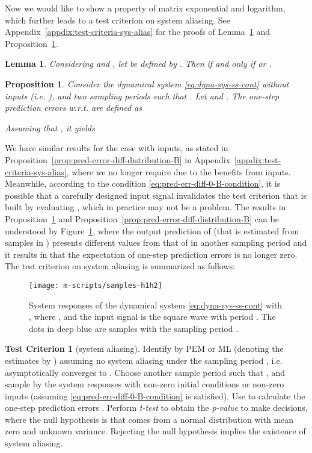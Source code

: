 \documentclass[letterpaper,10pt,journal,final]{IEEEtran}
\newtheorem{lemma}[theorem]{Lemma}
\newtheorem{proposition}[theorem]{Proposition}
\theoremstyle{definition}
\newtheorem*{criteria}{Test Criterion}
\theoremstyle{remark}
\begin{document}
Now we would like to show a property of matrix exponential and logarithm, which
further leads to a test criterion on system aliasing.  See
Appendix~\ref{appdix:test-criteria-sys-alias} for the proofs of
Lemma~\ref{lemma:diff-A-h1h2} and
Proposition~\ref{prop:pred-error-diff-distribution}.
\begin{lemma}
  \label{lemma:diff-A-h1h2}
  Considering  and , let
   be defined by . Then  if and only if  or .
\end{lemma}

\begin{proposition}
  \label{prop:pred-error-diff-distribution}
  Consider the dynamical system \eqref{eq:dyna-sys-ss-cont} without inputs (i.e.
  ), and two sampling periods  such that
  .  Let  and
  .  The one-step prediction errors w.r.t.  are defined as
  
  Assuming that , it yields
  
\end{proposition}



We have similar results for the case with inputs, as stated in
Proposition~\ref{prop:pred-error-diff-distribution-B} in
Appendix~\ref{appdix:test-criteria-sys-alias}, where we no longer require
 due to the benefits from inputs. Meanwhile, according to
the condition \eqref{eq:pred-err-diff-0-B-condition}, it is possible that a carefully
designed input signal invalidates the test criterion that is built by evaluating
, which in practice may not be a problem.
The results in Proposition~\ref{prop:pred-error-diff-distribution} and
Proposition~\ref{prop:pred-error-diff-distribution-B} can be understood by
Figure~\ref{fig:samples-diff-h1h2}, where the output prediction of  (that is
estimated from samples in ) presents different values from that of  in
another sampling period  and it results in that the expectation of one-step
prediction errors is no longer zero.  The test criterion on system aliasing is
summarized as follows:
\begin{figure}[htb]   \centering
  \texttt{[image: m-scripts/samples-h1h2]}
  \caption{System responses of the dynamical system \eqref{eq:dyna-sys-ss-cont} with
    , where , and the input
    signal is the square wave with period . The dots in deep
    blue are samples with the sampling period .}
  \label{fig:samples-diff-h1h2}
\end{figure}

\begin{criteria}[system aliasing]
  Identify  by PEM or ML (denoting the estimates by )
  assuming no system aliasing under the sampling period , i.e. 
  asymptotically converges to .  Choose another sample period 
  such that , and sample by  the system responses
  with non-zero initial conditions or non-zero inputs (assuming
  \eqref{eq:pred-err-diff-0-B-condition} is satisfied). Use  to
  calculate the one-step prediction errors . Perform \emph{t-test} to
  obtain the \emph{p-value} to make decisions, where the null hypothesis is that
   comes from a normal distribution with mean zero and unknown
  variance. Rejecting the null hypothesis implies the existence of system aliasing.
\end{criteria}
\end{document}
